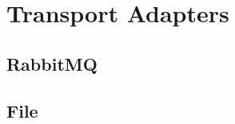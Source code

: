 \documentclass[paper=letter]{scrreport}
\begin{document}

\chapter{Transport Adapters}


\section{RabbitMQ}



\section{File}


\end{document}

